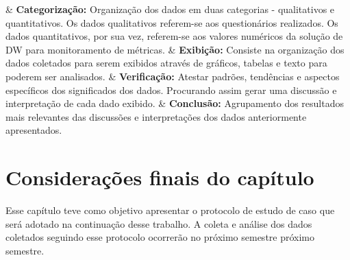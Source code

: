 \begin{easylist}[itemize]	
	
	& \textbf{Categorização: } Organização dos dados em duas categorias - qualitativos e quantitativos. Os 		dados qualitativos referem-se aos questionários realizados. Os dados quantitativos, por sua vez, 			referem-se aos valores numéricos da solução de DW para monitoramento de métricas. 
	& \textbf{Exibição: } Consiste na organização dos dados coletados para serem exibidos através de 				gráficos, tabelas e texto para poderem ser analisados. 
	& \textbf{Verificação: } Atestar padrões, tendências e aspectos específicos dos significados dos 				dados. Procurando assim gerar uma discussão e interpretação de cada dado exibido.
	& \textbf{Conclusão: } Agrupamento dos resultados mais relevantes das discussões e interpretações dos 			dados anteriormente apresentados.
	
	\end{easylist}	


\section{Considerações finais do capítulo}

Esse capítulo teve como objetivo apresentar o protocolo de estudo de caso que será adotado na continuação desse trabalho. A coleta e análise dos dados coletados seguindo esse protocolo ocorrerão no próximo semestre próximo semestre.

\label{estudo de caso}


